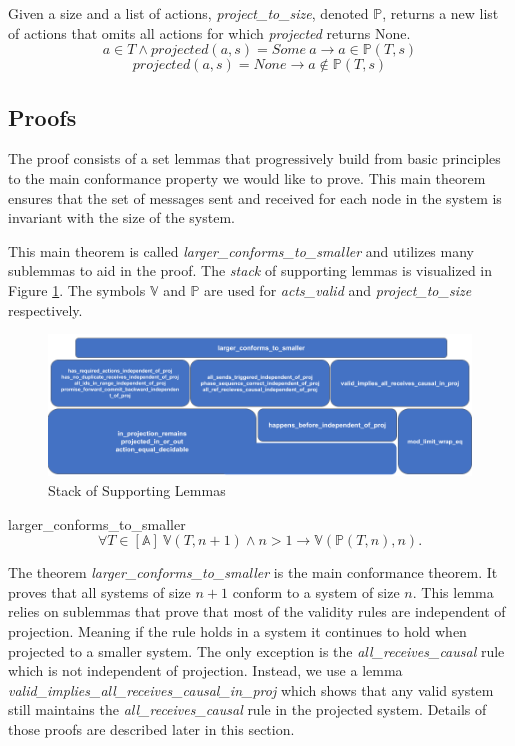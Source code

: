 \documentclass[runningheads]{llncs}
\newcommand{\action}{\mathds{A}}
\newcommand{\listaction}{[\action]}
\newcommand{\actsvalid}[2]{\mathds{V}(#1, #2)}
\newcommand{\projectsize}[2]{\mathds{P}(#1, #2)}
\begin{document}
\begin{definition}
Given a size and a list of actions, \emph{project\_to\_size}, denoted $\mathds{P}$, returns a new list of actions that omits all actions for which \emph{projected} returns None. 
$$
a \in T \wedge projected(a, s) = Some\ a \longrightarrow a \in \projectsize{T}{s}
$$
$$
projected(a, s) = None \longrightarrow a \notin \projectsize{T}{s}
$$
\end{definition}

\subsection{Proofs}
\label{sec:proofs}

The proof consists of a set lemmas that progressively build from basic principles to the main conformance property we would like to prove. This main theorem ensures that the set of messages sent and received for each node in the system is invariant with the size of the system. 

This main theorem is called \sloppy \emph{larger\_conforms\_to\_smaller} and utilizes many sublemmas to aid in the proof.
The \emph{stack} of supporting lemmas is visualized in Figure \ref{fig:coqLemmaStack}.
The symbols $\mathds{V}$ and $\mathds{P}$ are used for \emph{acts\_valid} and \emph{project\_to\_size} respectively. 

\begin{figure}[h]
    \centering
    \includegraphics[scale=0.35]{CoqLemmaStack.png}
    \caption{Stack of Supporting Lemmas}
    \label{fig:coqLemmaStack}
\end{figure}

\begin{theorem}{larger\_conforms\_to\_smaller}
\label{thm:maintheorem}
$$\forall T \in \listaction\ \actsvalid{T}{n+1} \wedge n > 1 \longrightarrow \actsvalid{\projectsize{T}{n}}{n}.$$
\end{theorem}

The theorem \emph{larger\_conforms\_to\_smaller} is the main conformance theorem. It proves that all systems of size $n+1$ conform to a system of size $n$. This lemma relies on sublemmas that prove that most of the validity rules are independent of projection. Meaning if the rule holds in a system it continues to hold when projected to a smaller system. The only exception is the \emph{all\_receives\_causal} rule which is not independent of projection. Instead, we use a lemma \emph{valid\_implies\_all\_receives\_causal\_in\_proj} which shows that any valid system still maintains the \emph{all\_receives\_causal} rule in the projected system. Details of those proofs are described later in this section. 
\end{document}
